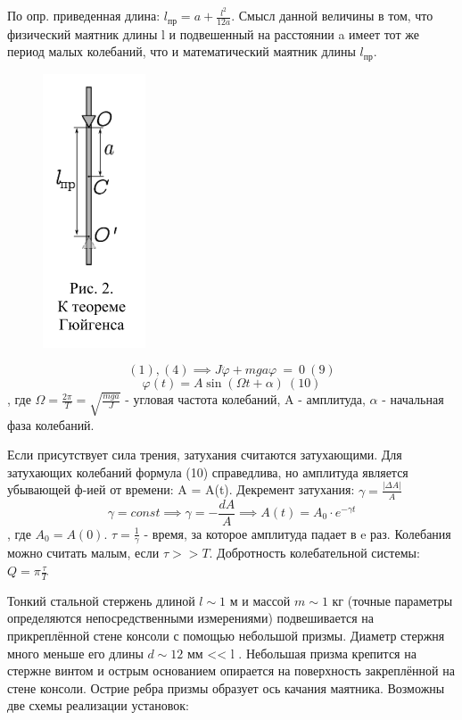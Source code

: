 \documentclass[a4paper,12pt]{article} %
\begin{document}
По опр. приведенная длина: $l_{\text{пр}} = a + \frac{l^2}{12a}$. Смысл данной величины в том, что физический маятник длины l и подвешенный на расстоянии a имеет тот же период малых колебаний, что и математический маятник длины $l_{\text{пр}}$.

\begin{figure} [H]
\center
\includegraphics[scale=0.8]{data/pic2.png}
\end{figure}

\[(1),(4) \implies J \ddot{\varphi} + mga \varphi \ = \ 0\ (9)\]
\[\varphi(t) = A \sin{(\Omega t + \alpha)}\ (10)\], где $\Omega = \frac{2\pi}{T} = \sqrt{\frac{mga}{J}}$ - угловая частота колебаний, A - амплитуда, $\alpha$ - начальная фаза колебаний.

Если присутствует сила трения, затухания считаются затухающими. Для затухающих колебаний формула (10) справедлива, но амплитуда является убывающей ф-ией от времени: A = A(t).
Декремент затухания: $\gamma = \frac{| \Delta A |}{A}$
\[\gamma = const \implies \gamma = -\frac{dA}{A} \implies A(t) = A_0 \cdot e^{-\gamma t}\], где $A_0 = A(0)$. \newline
$\tau = \frac{1}{\gamma}$ - время, за которое амплитуда падает в e раз.
Колебания можно считать малым, если $\tau >> T$.
Добротность колебательной системы: $Q = \pi \frac{\tau}{T}$

Тонкий стальной стержень длиной $l \sim 1$ м и массой $m \sim 1$ кг (точные параметры определяются непосредственными измерениями) подвешивается на прикреплённой стене консоли с помощью небольшой призмы. Диаметр стержня много меньше его длины $d \sim 12$ мм << l . Небольшая призма
крепится на стержне винтом и острым основанием опирается на поверхность закреплённой на стене консоли. Острие ребра призмы образует ось качания маятника.
Возможны две схемы реализации установок:
\end{document}
